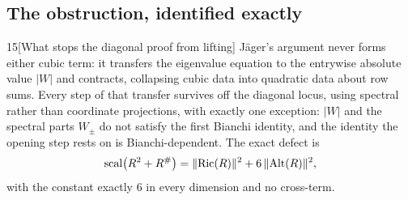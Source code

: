 \subsection{The obstruction, identified exactly}

\begin{Lem}{15}[What stops the diagonal proof from lifting]
J\"ager's argument never forms either cubic term: it transfers the eigenvalue equation to the entrywise absolute value $|W|$ and contracts, collapsing cubic data into quadratic data about row sums. Every step of that transfer survives off the diagonal locus, using spectral rather than coordinate projections, with exactly one exception: $|W|$ and the spectral parts $W_\pm$ do not satisfy the first Bianchi identity, and the identity the opening step rests on is Bianchi-dependent. The exact defect is
\[
\mathrm{scal}\big(R^2+R^{\#}\big)=\|\mathrm{Ric}(R)\|^2+6\,\|\mathrm{Alt}(R)\|^2,
\]
with the constant exactly $6$ in every dimension and no cross-term.
\end{Lem}

